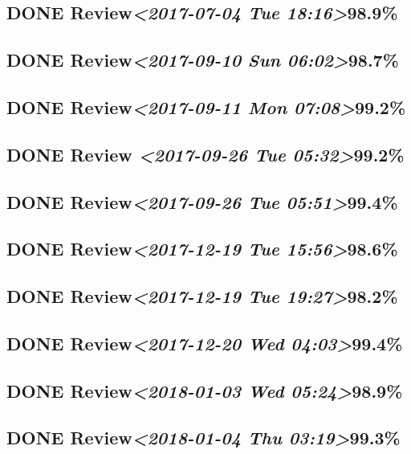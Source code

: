 \documentclass[11pt]{ctexart}
\begin{document}
\subsection{{\bfseries\sffamily DONE} Review\textit{<2017-07-04 Tue 18:16>}98.9\%}
\label{sec:org3fb9eeb}
\subsection{{\bfseries\sffamily DONE} Review\textit{<2017-09-10 Sun 06:02>}98.7\%}
\label{sec:orge00de84}
\subsection{{\bfseries\sffamily DONE} Review\textit{<2017-09-11 Mon 07:08>}99.2\%}
\label{sec:orgd82baf8}
\subsection{{\bfseries\sffamily DONE} Review \textit{<2017-09-26 Tue 05:32>}99.2\%}
\label{sec:org216cf6a}
\subsection{{\bfseries\sffamily DONE} Review\textit{<2017-09-26 Tue 05:51>}99.4\%}
\label{sec:orge23276d}

\subsection{{\bfseries\sffamily DONE} Review\textit{<2017-12-19 Tue 15:56>}98.6\%}
\label{sec:org8ab97c9}
\subsection{{\bfseries\sffamily DONE} Review\textit{<2017-12-19 Tue 19:27>}98.2\%}
\label{sec:org672b690}
\subsection{{\bfseries\sffamily DONE} Review\textit{<2017-12-20 Wed 04:03>}99.4\%}
\label{sec:org785c2ae}
\subsection{{\bfseries\sffamily DONE} Review\textit{<2018-01-03 Wed 05:24>}98.9\%}
\label{sec:org6d2ff26}
\subsection{{\bfseries\sffamily DONE} Review\textit{<2018-01-04 Thu 03:19>}99.3\%}
\label{sec:orgb9faea2}
\end{document}
